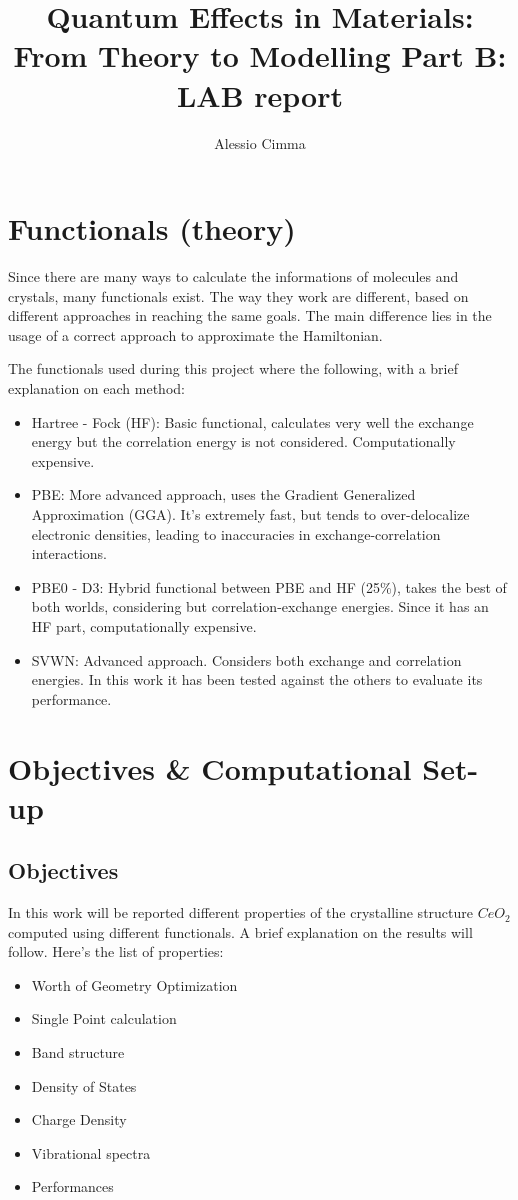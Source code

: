 \documentclass{article}
\title{Quantum Effects in Materials: From Theory to Modelling Part B: LAB report}
\author{Alessio Cimma}
\begin{document}
\maketitle

\tableofcontents
\newpage

\section{Functionals (theory)}

Since there are many ways to calculate the informations of molecules and crystals, many functionals exist.
The way they work are different, based on different approaches in reaching the same goals.
The main difference lies in the usage of a correct approach to approximate the Hamiltonian. 
 
The functionals used during this project where the following, with a brief explanation on each method:
\begin{itemize}
	\item Hartree - Fock (HF): Basic functional, calculates very well the exchange energy but the correlation energy is not considered. Computationally expensive.
	\item PBE: More advanced approach, uses the Gradient Generalized Approximation (GGA). It's extremely fast, but tends to over-delocalize electronic densities, leading to inaccuracies in exchange-correlation interactions.
	\item PBE0 - D3: Hybrid functional between PBE and HF (25\%), takes the best of both worlds, considering but correlation-exchange energies. Since it has an HF part, computationally expensive.
	\item SVWN: Advanced approach. Considers both exchange and correlation energies. In this work it has been tested against the others to evaluate its performance. 
\end{itemize}

\newpage
\section{Objectives \& Computational Set-up}
\subsection{Objectives}
In this work will be reported different properties of the crystalline structure $CeO_2$ computed using different functionals. A brief explanation on the results will follow.
Here's the list of properties:
\begin{itemize}
	\item Worth of Geometry Optimization 
	\item Single Point calculation
	\item Band structure 
	\item Density of States
	\item Charge Density
	\item Vibrational spectra
	\item Performances 
\end{itemize}
\end{document}
